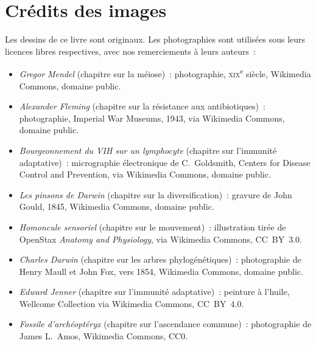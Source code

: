 \chapter*{Crédits des images}

\begingroup\sloppy

Les dessins de ce livre sont originaux. Les photographies sont
utilisées sous leurs licences libres respectives, avec nos
remerciements à leurs auteurs~:

\begin{itemize}
  \item \emph{Gregor Mendel} (chapitre sur la méiose)~: photographie,
        \textsc{xix}\textsuperscript{e} siècle, Wikimedia Commons,
        domaine public.
  \item \emph{Alexander Fleming} (chapitre sur la résistance aux
        antibiotiques)~: photographie, Imperial War Museums, 1943, via
        Wikimedia Commons, domaine public.
  \item \emph{Bourgeonnement du VIH sur un lymphocyte} (chapitre sur
        l'immunité adaptative)~: micrographie électronique de
        C.~Goldsmith, Centers for Disease Control and Prevention, via
        Wikimedia Commons, domaine public.
  \item \emph{Les pinsons de Darwin} (chapitre sur la
        diversification)~: gravure de John Gould, 1845, Wikimedia
        Commons, domaine public.
  \item \emph{Homoncule sensoriel} (chapitre sur le mouvement)~:
        illustration tirée de OpenStax \emph{Anatomy and Physiology},
        via Wikimedia Commons, CC~BY~3.0.
  \item \emph{Charles Darwin} (chapitre sur les arbres
        phylogénétiques)~: photographie de Henry Maull et John Fox,
        vers 1854, Wikimedia Commons, domaine public.
  \item \emph{Edward Jenner} (chapitre sur l'immunité adaptative)~:
        peinture à l'huile, Wellcome Collection via Wikimedia Commons,
        CC~BY~4.0.
  \item \emph{Fossile d'archéoptéryx} (chapitre sur l'ascendance
        commune)~: photographie de James L.~Amos, Wikimedia Commons,
        CC0.
\end{itemize}

